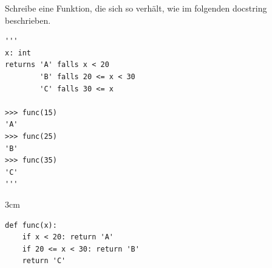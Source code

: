 
\question[1]
Schreibe eine Funktion, die sich so verhält, wie im folgenden docstring beschrieben.

 
\begin{lstlisting}
'''
x: int
returns 'A' falls x < 20
        'B' falls 20 <= x < 30
        'C' falls 30 <= x

>>> func(15)
'A'
>>> func(25)
'B'
>>> func(35)
'C'
'''

\end{lstlisting}

\begin{solutionbox}{3cm}
\begin{lstlisting}
def func(x):
    if x < 20: return 'A'
    if 20 <= x < 30: return 'B'
    return 'C'
\end{lstlisting}
\end{solutionbox}
